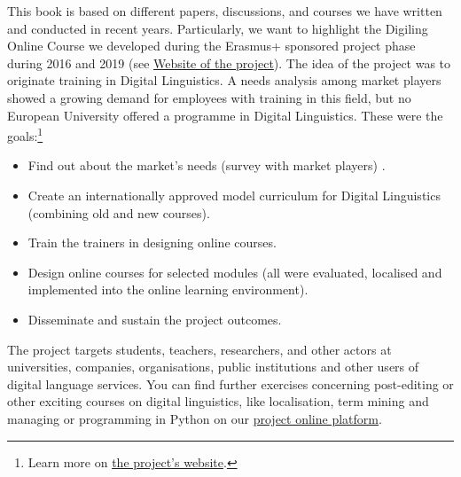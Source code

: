 \begin{refsection}

This book is based on different papers, discussions, and courses we have written and conducted in recent years. Particularly, we want to highlight the Digiling Online Course we developed during the Erasmus+ sponsored project phase during 2016 and 2019 (see \href{www.digiling.eu}{Website of the project}). 
The idea of the project was to originate training in Digital Linguistics. A needs analysis among market players showed a growing demand for employees with training in this field, but no European University offered a programme in Digital Linguistics. These were the goals:\footnote{Learn more on \href{http://www.digiling.eu/about/}{the project's website}.}
 \begin{itemize}
   \item Find out about the market's needs (survey with market players) .
   \item Create an internationally approved model curriculum for Digital Linguistics (combining old and new courses).
   \item Train the trainers in designing online courses.
   \item Design online courses for selected modules (all were evaluated, localised and implemented into the online learning environment).
   \item Disseminate and sustain the project outcomes.
\end{itemize}
The project targets students, teachers, researchers, and other actors at universities, companies, organisations, public institutions and other users of digital language services. You can find further exercises concerning post-editing or other exciting courses on digital linguistics, like localisation, term mining and managing or programming in Python on our \href{https://learn.digiling.eu}{project online platform}.


\printbibliography[heading=subbibliography]
\end{refsection}
